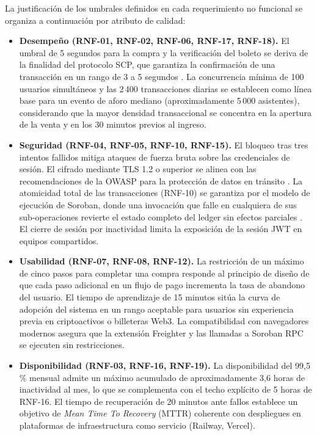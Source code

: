 La justificación de los umbrales definidos en cada requerimiento no funcional se organiza a continuación por
atributo de calidad:

\begin{itemize}
    \item \textbf{Desempeño (RNF-01, RNF-02, RNF-06, RNF-17, RNF-18).} El umbral de 5 segundos para la compra
y 
    la verificación del boleto se deriva de la finalidad del protocolo SCP, que garantiza la confirmación de
una 
    transacción en un rango de 3 a 5 segundos \cite{mazieres2015stellar}. La concurrencia mínima de 100
usuarios 
    simultáneos y las 2\,400 transacciones diarias se establecen como línea base para un evento de aforo
mediano 
    (aproximadamente 5\,000 asistentes), considerando que la mayor densidad transaccional se concentra en la 
    apertura de la venta y en los 30 minutos previos al ingreso.

    \item \textbf{Seguridad (RNF-04, RNF-05, RNF-10, RNF-15).} El bloqueo tras tres intentos fallidos mitiga 
    ataques de fuerza bruta sobre las credenciales de sesión. El cifrado mediante TLS 1.2 o superior se
alinea 
    con las recomendaciones de la OWASP para la protección de datos en tránsito \cite{owasp2024tls}. La
atomicidad 
    total de las transacciones (RNF-10) se garantiza por el modelo de ejecución de Soroban, donde una
invocación 
    que falle en cualquiera de sus sub-operaciones revierte el estado completo del ledger sin efectos
parciales 
    \cite{sdf2024soroban}. El cierre de sesión por inactividad limita la exposición de la sesión JWT en
equipos 
    compartidos.

    \item \textbf{Usabilidad (RNF-07, RNF-08, RNF-12).} La restricción de un máximo de cinco pasos para
completar 
    una compra responde al principio de diseño de que cada paso adicional en un flujo de pago incrementa la
tasa 
    de abandono del usuario. El tiempo de aprendizaje de 15 minutos sitúa la curva de adopción del sistema en
un 
    rango aceptable para usuarios sin experiencia previa en criptoactivos o billeteras Web3. La
compatibilidad con 
    navegadores modernos asegura que la extensión Freighter y las llamadas a Soroban RPC se ejecuten sin
restricciones.

    \item \textbf{Disponibilidad (RNF-03, RNF-16, RNF-19).} La disponibilidad del 99{,}5\,\% mensual admite un 
    máximo acumulado de aproximadamente 3{,}6 horas de inactividad al mes, lo que se complementa con el techo 
    explícito de 5 horas de RNF-16. El tiempo de recuperación de 20 minutos ante fallos establece un objetivo 
    de \textit{Mean Time To Recovery} (MTTR) coherente con despliegues en plataformas de infraestructura como 
    servicio (Railway, Vercel).


\end{itemize}
